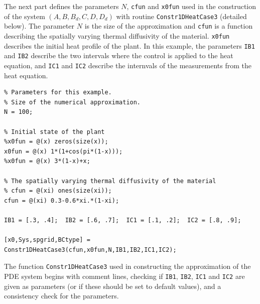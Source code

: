 \documentclass[11pt, a4paper]{amsart}
\theoremstyle{definition}
\numberwithin{equation}{section}
\begin{document}
The next part defines the parameters $N$, \texttt{cfun} and \texttt{x0fun} used in the construction of the system $(A,B,B_d,C,D,D_d)$ with routine \texttt{Constr1DHeatCase3} (detailed below). The parameter $N$ is the size of the approximation and \texttt{cfun} is a function describing the spatially varying thermal diffusivity of the material. \texttt{x0fun} describes the initial heat profile of the plant.
In this example, the parameters \texttt{IB1} and \texttt{IB2} describe the two intervals where the control is applied to the heat equation, and \texttt{IC1} and \texttt{IC2} describe the internvals of the measurements from the heat equation.

\begin{lstlisting}
% Parameters for this example.
% Size of the numerical approximation.
N = 100; 

% Initial state of the plant
%x0fun = @(x) zeros(size(x));
x0fun = @(x) 1*(1+cos(pi*(1-x)));
%x0fun = @(x) 3*(1-x)+x;

% The spatially varying thermal diffusivity of the material
% cfun = @(xi) ones(size(xi));
cfun = @(xi) 0.3-0.6*xi.*(1-xi);

IB1 = [.3, .4];  IB2 = [.6, .7];  IC1 = [.1, .2];  IC2 = [.8, .9];

[x0,Sys,spgrid,BCtype] = Constr1DHeatCase3(cfun,x0fun,N,IB1,IB2,IC1,IC2);
 \end{lstlisting}

The function \texttt{Constr1DHeatCase3} used in constructing the approximation of the PDE system begins with comment lines, checking if \texttt{IB1}, \texttt{IB2}, \texttt{IC1} and \texttt{IC2} are given as parameters (or if these should be set to default values), and a consistency check for the parameters.
\end{document}
